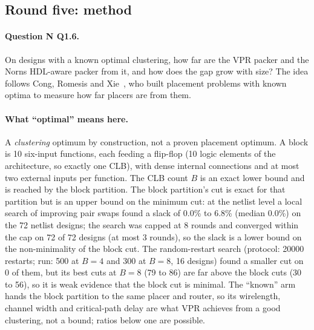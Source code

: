 
\subsection{Round five: method}
\label{sec:r5-method}
\paragraph{Question N Q1.6.} On designs with a known optimal clustering, how far are the VPR packer and the Norns HDL-aware packer from it, and how does the gap grow with size? The idea follows Cong, Romesis and Xie~\cite{Cong03tpeko}, who built placement problems with known optima to measure how far placers are from them.
\paragraph{What ``optimal'' means here.} A \emph{clustering} optimum by construction, not a proven placement optimum. A block is 10 six-input functions, each feeding a flip-flop (10 logic elements of the  architecture, so exactly one CLB), with dense internal connections and at most two external inputs per function. The CLB count $B$ is an exact lower bound and is reached by the block partition. The block partition's cut is exact for that partition but is an upper bound on the minimum cut: at the netlist level a local search of improving pair swaps found a slack of 0.0\% to 6.8\% (median 0.0\%) on the 72 netlist designs; the search was capped at 8 rounds and converged within the cap on 72 of 72 designs (at most 3 rounds), so the slack is a lower bound on the non-minimality of the block cut. The random-restart search (protocol: 20000 restarts; run: 500 at $B=4$ and 300 at $B=8$, 16 designs) found a smaller cut on 0 of them, but its best cuts at $B=8$ (79 to 86) are far above the block cuts (30 to 56), so it is weak evidence that the block cut is minimal. The ``known'' arm hands the block partition to the same placer and router, so its wirelength, channel width and critical-path delay are what VPR achieves from a good clustering, not a bound; ratios below one are possible.
